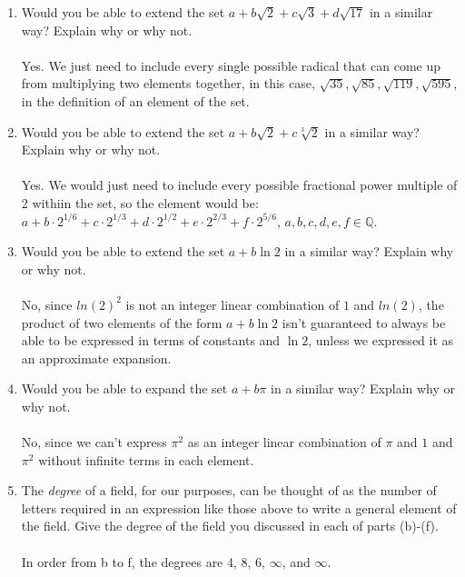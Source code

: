 \documentclass{article}
\newcommand{\Q}{\mathbb{Q}}
\begin{document}
\begin{enumerate}
\begin{enumerate}
            \item Would you be able to extend the set $a + b\sqrt{2} + c\sqrt{3} + d\sqrt{17}$ in a similar way? Explain why or why not.
            \\
            \\Yes. We just need to include every single possible radical that can come up from multiplying two elements together, in this case, $\sqrt{35}, \sqrt{85}, \sqrt{119}, \sqrt{595}$, in the definition of an element of the set.
            \item Would you be able to extend the set $a + b\sqrt{2} + c\sqrt[3]{2}$ in a similar way? Explain why or why not.
            \\
            \\Yes. We would just need to include every possible fractional power multiple of 2 withiin the set, so the element would be: $a + b\cdot2^{1/6} + c\cdot2^{1/3} + d\cdot2^{1/2} + e\cdot2^{2/3}+f\cdot2^{5/6}$, $a,b,c,d,e,f \in \Q$.
            \item Would you be able to extend the set $a + b\ln 2$ in a similar way? Explain why or why not.
            \\
            \\No, since $ln(2)^2$ is not an integer linear combination of $1$ and $ln(2)$, the product of two elements of the form $a + b\ln 2$ isn't guaranteed to always be able to be expressed in terms of constants and $\ln 2$, unless we expressed it as an approximate expansion.
            \item Would you be able to expand the set $a + b\pi$ in a similar way? Explain why or why not. 
            \\
            \\No, since we can't express $\pi^2$ as an integer linear combination of $\pi$ and $1$ and $\pi^2$ without infinite terms in each element.
            \item The \textit{degree} of a field, for our purposes, can be thought of as the number of letters required in an expression like those above to write a general element of the field. Give the degree of the field you discussed in each of parts (b)-(f).
            \\
            \\In order from b to f, the degrees are 4, 8, 6, $\infty$, and $\infty$.
        \end{enumerate}
    \end{enumerate}
\end{document}
